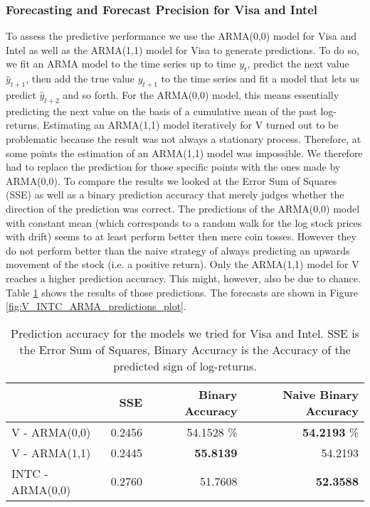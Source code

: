 \subsubsection{Forecasting and Forecast Precision for Visa and Intel}
To assess the predictive performance we use the ARMA(0,0) model for Visa and Intel as well as the ARMA(1,1) model for Visa to generate predictions. To do so, we fit an ARMA model to the time series up to time $y_t$, predict the next value $\hat{y}_{t+1}$, then add the true value $y_{t+1}$ to the time series and fit a model that lets us predict $\hat{y}_{t + 2}$ and so forth. For the ARMA(0,0) model, this means essentially predicting the next value on the basis of a cumulative mean of the past log-returns. Estimating an ARMA(1,1) model iteratively for V turned out to be problematic because the result was not always a stationary process. Therefore, at some points the estimation of an ARMA(1,1) model was impossible. We therefore had to replace the prediction for those specific points with the ones made by ARMA(0,0). 
To compare the results we looked at the Error Sum of Squares (SSE) as well as a binary prediction accuracy that merely judges whether the direction of the prediction was correct. The predictions of the ARMA(0,0) model with constant mean (which corresponds to a random walk for the log stock prices with drift) seems to at least perform better then mere coin tosses. However they do not perform better than the naive strategy of always predicting an upwards movement of the stock (i.e. a positive return). Only the ARMA(1,1) model for V reaches a higher prediction accuracy. This might, however, also be due to chance. Table \ref{tab:V_INTC_ARMA_predictions} shows the results of those predictions. The forecasts are shown in Figure \ref{fig:V_INTC_ARMA_predictions_plot}. 
\begin{table}[]
    \centering
    \small
    \begin{tabular}{lrrr}
    \toprule
    {}  & SSE & Binary Accuracy & Naive Binary Accuracy \\
    \midrule
    V - ARMA(0,0) & 0.2456 & 54.1528 \% & \textbf{54.2193} \% \\
    V - ARMA(1,1) & 0.2445 & \textbf{55.8139} & 54.2193 \\
    INTC - ARMA(0,0) & 0.2760 & 51.7608 & \textbf{52.3588} \\
    \bottomrule
    \end{tabular}
    \caption{Prediction accuracy for the models we tried for Visa and Intel. SSE is the Error Sum of Squares, Binary Accuracy is the Accuracy of the predicted sign of log-returns.}
    \label{tab:V_INTC_ARMA_predictions}
\end{table}{}
